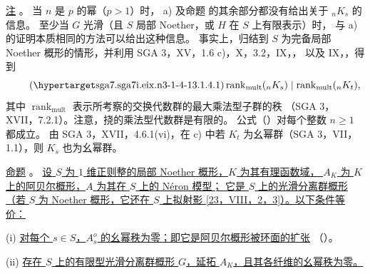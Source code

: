 \medskip
\noindent
\underline{注} 。
当 $n$ 是 $p$ 的幂（$p>1$）时， a) 及命题
 的其余部分都没有给出关于 ${}_nK_s$ 的信息。
至少当 $G$ 光滑（且 $S$ 局部 Noether，或 $H$ 在 $S$ 上有限表示）时，
与 a) 的证明本质相同的方法可以给出这种信息。
事实上，归结到 $S$ 为完备局部 Noether 概形的情形，并利用
SGA 3，XV，1.6 c)，X，3.2，IX，，
以及 IX，，得到
\begin{equation}\tag{\SGARefTarget{sga7.sga7i.eix.n3-1-4-1}{3.1.4.1}}
 \operatorname{rank}_{\mathrm{mult}}({}_nK_s)
 \mid
 \operatorname{rank}_{\mathrm{mult}}({}_nK_t),
\end{equation}
其中 $\operatorname{rank}_{\mathrm{mult}}$ 表示所考察的交换代数群的最大乘法型子群的秩
（SGA 3，XVII，7.2.1）。注意，挠的乘法型代数群是有限的。
公式（）对每个整数 $n\geq1$ 都成立。
由 SGA 3，XVII，4.6.1(vi)，在 c) 中若 $K_t$ 为幺幂群（SGA 3，VII，1.1），则 $K_s$ 也为幺幂群。



\medskip
\noindent
\underline{命题} 。
\underline{设 $S$ 为 $1$ 维正则整的局部 Noether 概形，$K$ 为其有理函数域，
$A_K$ 为 $K$ 上的阿贝尔概形，$A$ 为其在 $S$ 上的 N\'eron 模型；
它是 $S$ 上的光滑分离群概形（若 $S$ 为 Noether 概形，它还在 $S$ 上拟射影
[23，VIII，2，3\textdegree]）。以下条件等价：}

\smallskip
\noindent
(i) \underline{对每个 $s\in S$，$A_s^o$ 的幺幂秩为零；即它是阿贝尔概形被环面的扩张}
（）。

\smallskip
\noindent
(ii) \underline{存在 $S$ 上的有限型光滑分离群概形 $G$，延拓 $A_K$，且其各纤维的幺幂秩为零。}

